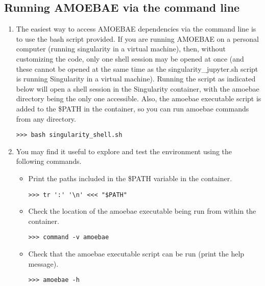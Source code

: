 \documentclass[12pt,letterpaper]{article}
\begin{document}
\begin{linenumbers}
\begin{enumerate}
\end{enumerate}


\subsection{Running AMOEBAE via the command line}
\label{shell_section}

\begin{enumerate}

\item The easiest way to access AMOEBAE dependencies via the command line is to
    use the bash script provided. If you are running AMOEBAE on a personal
        computer (running singularity in a virtual
        machine), then, without customizing the code, only one shell session may be
        opened at once (and these cannot be opened at the same time as the
        singularity\_jupyter.sh script is running Singularity in a virtual
        machine). Running the script as indicated below will open a shell
        session in the Singularity container, with the amoebae directory being
        the only one accessible. Also, the amoebae executable script is added
        to the \$PATH in the container, so you can run amoebae commands from
        any directory.

\begin{lstlisting}
>>> bash singularity_shell.sh
\end{lstlisting}

\item You may find it useful to explore and test the environment using the
    following commands.

\begin{itemize}

\item Print the paths included in the \$PATH variable in the container.
\begin{lstlisting}
>>> tr ':' '\n' <<< "$PATH"
\end{lstlisting}

\item Check the location of the amoebae executable being run from within
    the container.
\begin{lstlisting}
>>> command -v amoebae
\end{lstlisting}

\item Check that the amoebae executable script can be run (print the help
    message).
\begin{lstlisting}
>>> amoebae -h
\end{lstlisting}


\end{itemize}
\end{enumerate}
\end{linenumbers}
\end{document}
